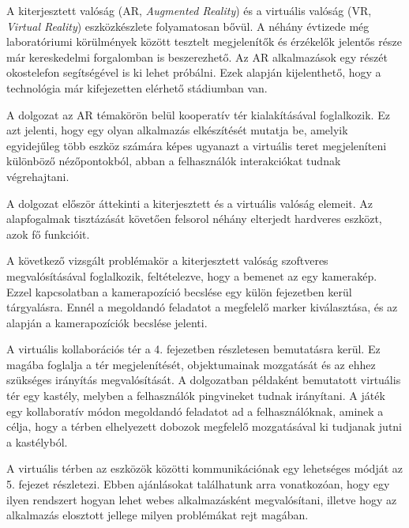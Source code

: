 
A kiterjesztett valóság (AR, \textit{Augmented Reality}) és a virtuális valóság (VR, \textit{Virtual Reality}) eszközkészlete folyamatosan bővül.
A néhány évtizede még laboratóriumi körülmények között tesztelt megjelenítők és érzékelők jelentős része már kereskedelmi forgalomban is beszerezhető.
Az AR alkalmazások egy részét okostelefon segítségével is ki lehet próbálni.
Ezek alapján kijelenthető, hogy a technológia már kifejezetten elérhető stádiumban van.

A dolgozat az AR témakörön belül kooperatív tér kialakításával foglalkozik.
Ez azt jelenti, hogy egy olyan alkalmazás elkészítését mutatja be, amelyik egyidejűleg több eszköz számára képes ugyanazt a virtuális teret megjeleníteni különböző nézőpontokból, abban a felhasználók interakciókat tudnak végrehajtani.

A dolgozat először áttekinti a kiterjesztett és a virtuális valóság elemeit.
Az alapfogalmak tisztázását követően felsorol néhány elterjedt hardveres eszközt, azok fő funkcióit.

A következő vizsgált problémakör a kiterjesztett valóság szoftveres megvalósításával foglalkozik, feltételezve, hogy a bemenet az egy kamerakép.
Ezzel kapcsolatban a kamerapozíció becslése egy külön fejezetben kerül tárgyalásra.
Ennél a megoldandó feladatot a megfelelő marker kiválasztása, és az alapján a kamerapozíciók becslése jelenti.

A virtuális kollaborációs tér a 4. fejezetben részletesen bemutatásra kerül. Ez magába foglalja a tér megjelenítését, objektumainak mozgatását és az ehhez szükséges irányítás megvalósítását.
A dolgozatban példaként bemutatott virtuális tér egy kastély, melyben a felhasználók pingvineket tudnak irányítani.
A játék egy kollaboratív módon megoldandó feladatot ad a felhasználóknak, aminek a célja, hogy a térben elhelyezett dobozok megfelelő mozgatásával ki tudjanak jutni a kastélyból.

A virtuális térben az eszközök közötti kommunikációnak egy lehetséges módját az 5. fejezet részletezi. Ebben ajánlásokat találhatunk arra vonatkozóan, hogy egy ilyen rendszert hogyan lehet webes alkalmazásként megvalósítani, illetve hogy az alkalmazás elosztott jellege milyen problémákat rejt magában.
